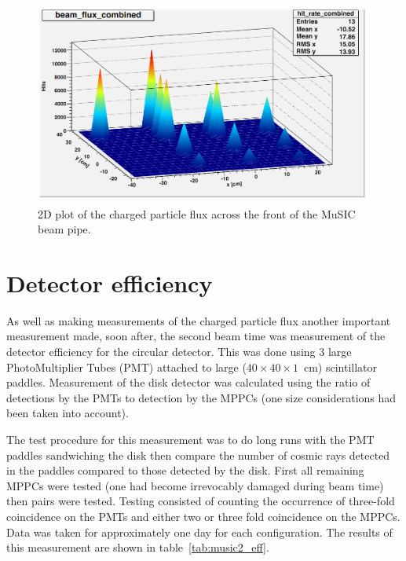  \begin{figure}[hptb]
     \centering
         \includegraphics[width=.9\textwidth]{images/charged_flux/2D_hit_rate_dist.png}
     \caption{2D plot of the charged particle flux across the front of the MuSIC beam pipe.}
     \label{fig:2D_flux}
 \end{figure}
 
\section{Detector efficiency} %
\label{sec:detector_efficiency}
As well as making measurements of the charged particle flux another important measurement made, soon after, the second beam time was measurement of the detector efficiency for the circular detector. This was done using 3 large PhotoMultiplier Tubes (PMT) attached to large (\( 40\times40\times1 \)~cm) scintillator paddles. Measurement of the disk detector was calculated using the ratio of detections by the PMTs to detection by the MPPCs (one size considerations had been taken into account).

The test procedure for this measurement was to do long runs with the PMT paddles sandwiching the disk then compare the number of cosmic rays detected in the paddles compared to those detected by the disk. First all remaining MPPCs were tested (one had become irrevocably damaged during beam time) then pairs were tested. Testing consisted of counting the occurrence of three-fold coincidence on the PMTs and either two or three fold coincidence on the MPPCs. Data was taken for approximately one day for each configuration. The results of this measurement are shown in table~\ref{tab:music2_eff}.

